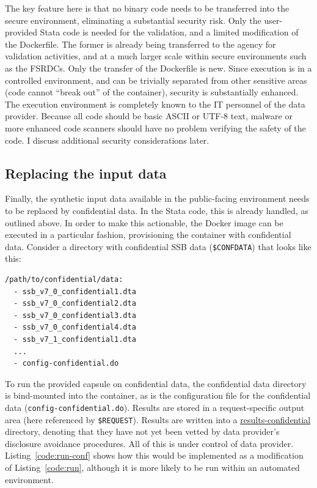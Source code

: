 \documentclass[inline]{hdsr}
\begin{document}
The key feature here is that no binary code needs to be transferred into the secure environment, eliminating a substantial security risk. Only the user-provided Stata code is needed for the validation, and a limited modification of the Dockerfile. The former is already being transferred to the agency for validation activities, and at a much larger scale within secure environments such as the \acp{FSRDC}. Only the transfer of the Dockerfile is new. Since execution is in a controlled environment, and can be trivially separated from other sensitive areas (code cannot ``break out'' of the container), security is substantially enhanced. The execution environment is completely known to the IT personnel of the data provider. Because all code should be basic ASCII or UTF-8 text, malware or more enhanced code scanners should have no problem verifying the safety of the code. I discuss additional security considerations later.

\subsection{Replacing the input data}

Finally, the synthetic input data available in the public-facing environment needs to be replaced by confidential data. In the Stata code, this is already handled, as outlined above. In order to make this actionable, the Docker image can be executed in a particular fashion, provisioning the container with confidential data. Consider a directory with confidential SSB data (\texttt{\$CONFDATA}) that looks like this:

\begin{lstlisting}[language=bash]
/path/to/confidential/data:
  - ssb_v7_0_confidential1.dta
  - ssb_v7_0_confidential2.dta
  - ssb_v7_0_confidential3.dta
  - ssb_v7_0_confidential4.dta
  - ssb_v7_1_confidential1.dta
  ...
  - config-confidential.do   
\end{lstlisting}

To run the provided capsule on confidential data, the confidential data directory is  bind-mounted into the container, as is the configuration file for the confidential data (\texttt{config-confidential.do}). Results are stored in a request-specific output area (here referenced by \texttt{\$REQUEST}). Results are written into a \url{results-confidential} directory, denoting that they have not yet been vetted by data provider's disclosure avoidance procedures. All of this is under control of data provider. Listing~\ref{code:run-conf} shows how this would be implemented as a  modification of Listing~\ref{code:run}, although it is more likely to be run within an automated environment. 
\end{document}
